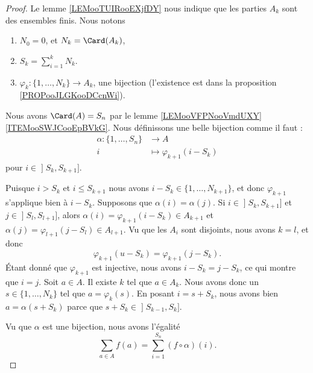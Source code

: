 \begin{proof}
	Le lemme \ref{LEMooTUIRooEXjfDY} nous indique que les parties \( A_k\) sont des ensembles finis. Nous notons
	\begin{enumerate}
		\item
		      \( N_0=0\), et \( N_k=\Card(A_k)\),
		\item
		      \( S_k=\sum_{i=1}^kN_k\).
		\item
		      \( \varphi_k\colon \{ 1,\ldots, N_k \}\to A_k\), une bijection (l'existence est dans la proposition \ref{PROPooJLGKooDCcnWi}).
	\end{enumerate}
	Nous avons \( \Card(A)=S_n\) par le lemme \ref{LEMooVFPNooVmdUXY}\ref{ITEMooSWJCooEpBVkG}. Nous définissons une belle bijection comme il faut :
	\begin{equation}
		\begin{aligned}
			\alpha\colon \{ 1,\ldots, S_n \} & \to A                        \\
			i                                & \mapsto \varphi_{k+1}(i-S_k)
		\end{aligned}
	\end{equation}
	pour \( i\in\mathopen] S_k , S_{k+1} \mathclose]\).

	\begin{subproof}
		Puisque \( i>S_k\) et \( i\leq S_{k+1}\) nous avons \( i-S_k\in \{ 1,\ldots, N_{k+1} \}\), et donc \( \varphi_{k+1}\) s'applique bien à \( i-S_k\).
		Supposons que \( \alpha(i)=\alpha(j)\). Si \( i\in \mathopen] S_k , S_{k+1} \mathclose]\) et \( j\in \mathopen] S_l , S_{l+1} \mathclose]\), alors \( \alpha(i)=\varphi_{k+1}(i-S_k)\in A_{k+1}\) et \( \alpha(j)=\varphi_{l+1}(j-S_l)\in A_{l+1}\). Vu que les \( A_i\) sont disjoints, nous avons \( k=l\), et donc
		\begin{equation}
			\varphi_{k+1}(u-S_k)=\varphi_{k+1}(j-S_k).
		\end{equation}
		Étant donné que \( \varphi_{k+1}\) est injective, nous avons \( i-S_k=j-S_k\), ce qui montre que \( i=j\).
		Soit \( a\in A\). Il existe \( k\) tel que \( a\in A_k\). Nous avons donc un \( s\in\{ 1,\ldots, N_k \}\) tel que \( a=\varphi_k(s)\). En posant \( i=s+S_k\), nous avons bien \( a=\alpha(s+S_k)\) parce que \( s+S_k\in \mathopen] S_{k-1} , S_k \mathclose]\).
	\end{subproof}
	Vu que \( \alpha\) est une bijection, nous avons l'égalité
	\begin{equation}
		\sum_{a\in A}f(a)=\sum_{i=1}^{S_n}(f\circ \alpha)(i).
	\end{equation}


\end{proof}
